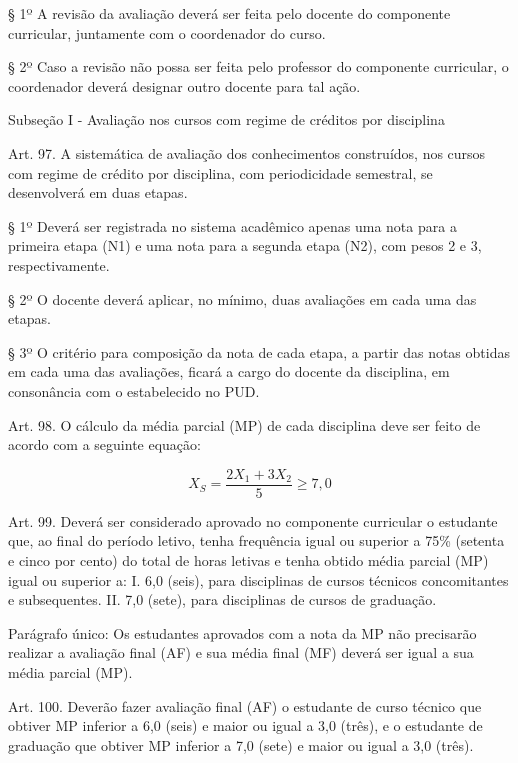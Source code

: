 \documentclass{paper}
\begin{document}
§ 1º A revisão da avaliação deverá ser feita pelo docente do componente curricular, juntamente com o coordenador do curso.

§ 2º Caso a revisão não possa ser feita pelo professor do componente curricular, o coordenador deverá designar outro docente para tal ação.

\begin{center}
Subseção I - Avaliação nos cursos com regime de créditos por disciplina
\end{center}

Art. 97. A sistemática de avaliação dos conhecimentos construídos, nos cursos com regime de crédito por disciplina, com periodicidade semestral, se desenvolverá em duas etapas.

§ 1º Deverá ser registrada no sistema acadêmico apenas uma nota para a primeira etapa (N1) e uma nota para a segunda etapa (N2), com pesos 2 e 3, respectivamente.

§ 2º O docente deverá aplicar, no mínimo, duas avaliações em cada uma das etapas.

§ 3º O critério para composição da nota de cada etapa, a partir das notas obtidas em cada uma das avaliações, ficará a cargo do docente da disciplina, em consonância com o estabelecido no PUD.

Art. 98. O cálculo da média parcial (MP) de cada disciplina deve ser feito de acordo com a seguinte equação:

\begin{equation*}
X_S=\frac{2X_1+3X_2}{5}\geq 7,0
\end{equation*}
\vspace{0,3cm}

Art. 99. Deverá ser considerado aprovado no componente curricular o estudante que, ao final do período letivo, tenha frequência igual ou superior a 75\% (setenta e cinco por cento) do total de horas letivas e tenha obtido média parcial (MP) igual ou superior a:
I. 6,0 (seis), para disciplinas de cursos técnicos concomitantes e subsequentes.
II. 7,0 (sete), para disciplinas de cursos de graduação.

Parágrafo único: Os estudantes aprovados com a nota da MP não precisarão realizar a avaliação final (AF) e sua média final (MF) deverá ser igual a sua média parcial (MP).

Art. 100. Deverão fazer avaliação final (AF) o estudante de curso técnico que obtiver MP inferior a 6,0 (seis) e maior ou igual a 3,0 (três), e o estudante de graduação que obtiver MP inferior a 7,0 (sete) e maior ou igual a 3,0 (três).
\end{document}
